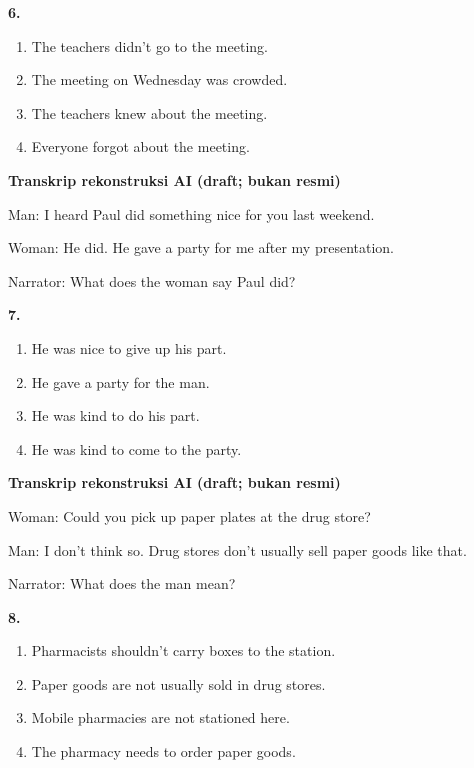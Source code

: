 \documentclass[12pt]{article}
\begin{document}
\noindent\textbf{6.}
\begin{enumerate}[label=(\Alph*),leftmargin=*,itemsep=0.2em]
\item The teachers didn't go to the meeting.
\item The meeting on Wednesday was crowded.
\item The teachers knew about the meeting.
\item Everyone forgot about the meeting.
\end{enumerate}
\par
\vspace{0.25\baselineskip}
\begin{exampleblock}
\textbf{Transkrip rekonstruksi AI (draft; bukan resmi)}\par
Man: I heard Paul did something nice for you last weekend.\par
Woman: He did. He gave a party for me after my presentation.\par
Narrator: What does the woman say Paul did?\par
\end{exampleblock}
\noindent\textbf{7.}
\begin{enumerate}[label=(\Alph*),leftmargin=*,itemsep=0.2em]
\item He was nice to give up his part.
\item He gave a party for the man.
\item He was kind to do his part.
\item He was kind to come to the party.
\end{enumerate}
\par
\vspace{0.25\baselineskip}
\begin{exampleblock}
\textbf{Transkrip rekonstruksi AI (draft; bukan resmi)}\par
Woman: Could you pick up paper plates at the drug store?\par
Man: I don't think so. Drug stores don't usually sell paper goods like that.\par
Narrator: What does the man mean?\par
\end{exampleblock}
\noindent\textbf{8.}
\begin{enumerate}[label=(\Alph*),leftmargin=*,itemsep=0.2em]
\item Pharmacists shouldn't carry boxes to the station.
\item Paper goods are not usually sold in drug stores.
\item Mobile pharmacies are not stationed here.
\item The pharmacy needs to order paper goods.
\end{enumerate}
\end{document}
